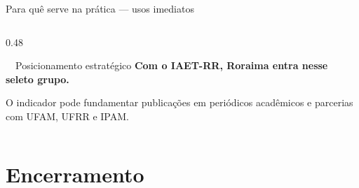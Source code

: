 \documentclass[aspectratio=169, 11pt]{beamer}
\begin{document}
\begin{frame}{Para quê serve na prática — usos imediatos}
\begin{columns}[T]
\begin{column}{0.48\textwidth}
\begin{alertblock}{\faGlobe\ \ Posicionamento estratégico}
        \vspace{0.3cm}
        \textbf{Com o IAET-RR, Roraima entra nesse seleto grupo.}
      \end{alertblock}

      \vspace{0.2cm}
      {\small\color{seplanblue}
      O indicador pode fundamentar publicações em periódicos acadêmicos
      e parcerias com UFAM, UFRR e IPAM.}
    \end{column}
  \end{columns}

\end{frame}

\section{Encerramento}
\end{document}
